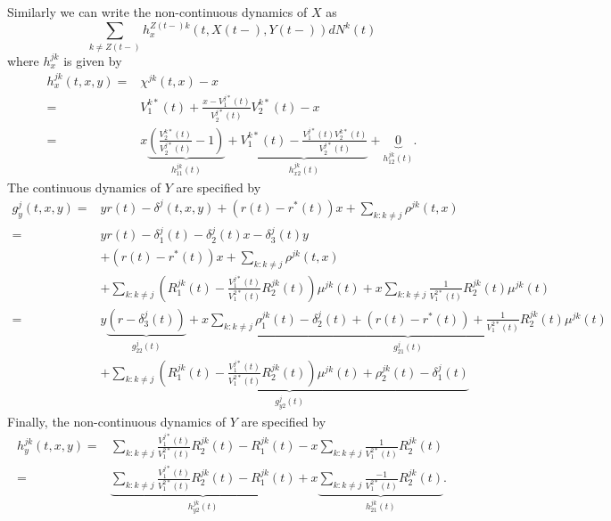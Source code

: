 \documentclass[12pt]{article}
\theoremstyle{my_thm}
\begin{document}
Similarly we can write the non-continuous dynamics of $X$ as 
$$
\sum_{k \neq Z(t-)} h_x^{Z(t-)k}(t,X(t-),Y(t-)) dN^k(t)
$$ where $h^{jk}_x$ is given by
\begin{align*}
h^{jk}_x(t,x,y)=&\chi^{jk}(t,x) -x
\\
=&
V^{k*}_1(t) + \frac{x-V^{j*}_1(t)}{V^{j*}_2(t)}V^{k*}_2(t) -x
\\
=&
x
\underbrace{\left( \frac{V^{k*}_2(t)}{V^{j*}_2(t)}-1 \right)}_{h^{jk}_{11}(t)}+\underbrace{V^{k*}_1(t) - \frac{V^{j*}_1(t)V^{k*}_2(t)}{V^{j*}_2(t)}}_{h^{jk}_{x2}(t)}+\underbrace{0}_{h^{jk}_{12}(t)}.
\end{align*}
The continuous dynamics of $Y$ are specified by
\begin{align*}
g^{j}_y(t,x,y)=&y r(t) - \delta^j(t,x,y) + (r(t)-r^*(t)) x + \sum_{k:k \neq j} \rho^{jk}(t,x) 
\\
=&y r(t) - \delta_1^j(t)-\delta_2^j(t)x-\delta_3^j(t)y
\\
&+ (r(t)-r^*(t)) x
+\sum_{k:k \neq j} \rho^{jk}(t,x) 
\\
&+ \sum_{k:k \neq j}  \left( R_1^{jk}(t) - \frac{V_1^{j*}(t)}{V_1^{2*}(t)}R_2^{jk}(t) \right) \mu^{jk}(t)
+ x \sum_{k:k \neq j} \frac{1}{V_1^{2*}(t)}R_2^{jk}(t)\mu^{jk}(t)
\\
=& y \underbrace{\left( r-\delta_3^j(t)\right)
}_{g^j_{22}(t)} 
+ x \underbrace{\sum_{k:k \neq j} \rho^{jk}_1(t) -\delta_2^j(t)
+ (r(t)-r^*(t))  +\frac{1}{V_1^{2*}(t)}R_2^{jk}(t)\mu^{jk}(t) }_{g^j_{21}(t)}
\\
&+\underbrace{\sum_{k:k \neq j} \left( R_1^{jk}(t) - \frac{V_1^{j*}(t)}{V_1^{2*}(t)}R_2^{jk}(t) \right) \mu^{jk}(t)+ \rho^{jk}_2(t)- \delta_1^j(t) }_{g^j_{y2}(t)}
\end{align*}
Finally, the non-continuous dynamics of $Y$ are specified by
\begin{align*}
h_y^{jk}(t,x,y)=&\sum_{k:k \neq j}   \frac{V_1^{j*}(t)}{V_1^{2*}(t)}R_2^{jk}(t) - R_1^{jk}(t) 
- x \sum_{k:k \neq j} \frac{1}{V_1^{2*}(t)}R_2^{jk}(t)
\\
=&
\underbrace{\sum_{k:k \neq j}   \frac{V_1^{j*}(t)}{V_1^{2*}(t)}R_2^{jk}(t) - R_1^{jk}(t) }_{h^{jk}_{y2}(t)}
+x  \underbrace{\sum_{k:k \neq j} \frac{-1}{V_1^{2*}(t)}R_2^{jk}(t)}_{h_{21}^{jk}(t)}.
\end{align*}


\newpage


\end{document}
